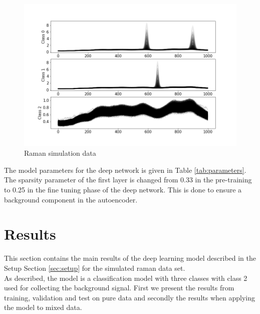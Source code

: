 \documentclass{article}
\begin{document}
\begin{figure}[H]
	\centering
	\includegraphics[width=1\linewidth]{raman_sim_training_data_2.png}  
	\caption{Raman simulation data}
	\label{fig:raman}
\end{figure}

The model parameters for the deep network is given in Table \ref{tab:parameters}. The sparsity parameter of the first layer is changed from 0.33 in the pre-training to 0.25 in the fine tuning phase of the deep network. This is done to ensure a background component in the autoencoder.
\vspace*{-0.2 cm}
\section{Results}
\label{sec:results}
This section contains the main results of the deep learning model described in the Setup Section \ref{sec:setup} for the simulated raman data set.\\
As described, the model is a classification model with three classes with class 2 used for collecting the background signal. First we present the results from training, validation and test on pure data and secondly the results when applying the model to mixed data.%
\vspace*{-0.2 cm}
\end{document}
